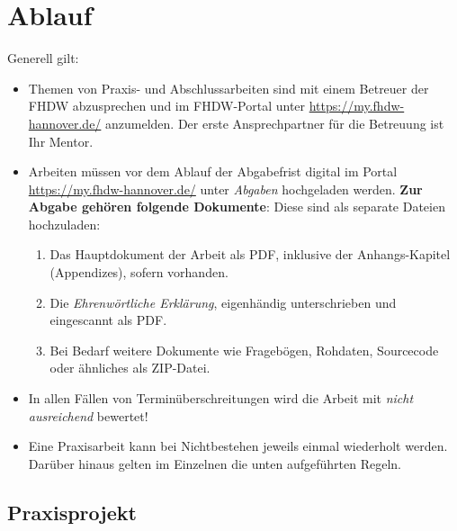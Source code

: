 \chapter{Ablauf}

Generell gilt:
\begin{itemize}
    \item Themen von Praxis- und Abschlussarbeiten sind mit einem  Betreuer der FHDW abzusprechen und im FHDW-Portal unter \url{https://my.fhdw-hannover.de/} anzumelden. Der erste Ansprechpartner für die Betreuung ist Ihr Mentor. 
    \item Arbeiten müssen vor dem Ablauf der Abgabefrist digital im Portal \url{https://my.fhdw-hannover.de/} unter \textit{Abgaben} hochgeladen werden. \textbf{Zur Abgabe gehören folgende Dokumente}: Diese sind als separate Dateien hochzuladen:
    \begin{enumerate}
        \item Das Hauptdokument der Arbeit als PDF, inklusive der Anhangs-Kapitel (Appendizes), sofern vorhanden.
        \item Die \textit{Ehrenwörtliche Erklärung}, eigenhändig  unterschrieben und eingescannt als PDF.
        \item Bei Bedarf weitere Dokumente wie Fragebögen, Rohdaten, Source\-code oder ähnliches als ZIP-Datei.
    \end{enumerate}
    \item In allen Fällen von Terminüberschreitungen wird die Arbeit mit \textit{nicht ausreichend} bewertet!
    \item Eine Praxisarbeit kann bei Nichtbestehen jeweils einmal wiederholt werden. Darüber hinaus gelten im Einzelnen die unten aufgeführten Regeln.
\end{itemize}

\section{Praxisprojekt}
\label{sec:praxisprojekt}

